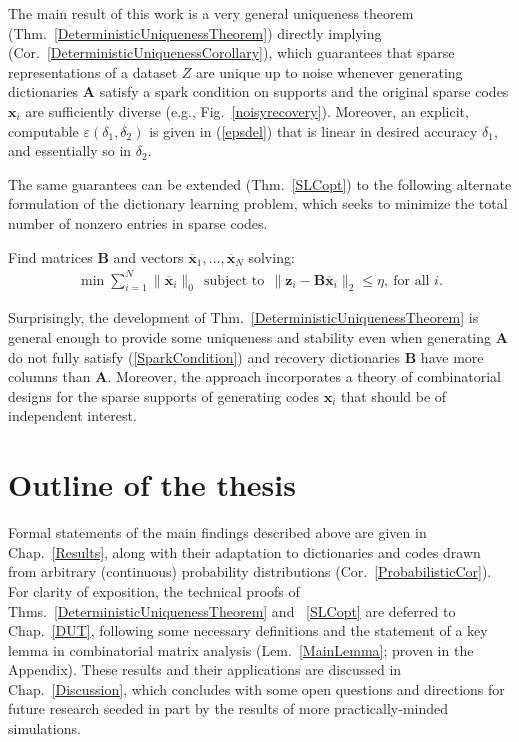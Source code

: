 The main result of this work is a very general uniqueness theorem (Thm.~\ref{DeterministicUniquenessTheorem}) directly 
implying (Cor.~\ref{DeterministicUniquenessCorollary}), which guarantees that sparse representations of a dataset $Z$ are unique up to noise whenever generating dictionaries $\mathbf{A}$ satisfy a spark condition on supports and the original sparse codes $\mathbf{x}_i$ are sufficiently diverse (e.g., Fig.~\ref{noisyrecovery}).  Moreover, an explicit, computable $\varepsilon(\delta_1, \delta_2)$ is given in (\ref{epsdel}) that is linear in desired accuracy $\delta_1$, and essentially so in $\delta_2$.

The same guarantees can be extended (Thm.~\ref{SLCopt}) to the following alternate formulation of the dictionary learning problem, which seeks to minimize the total number of nonzero entries in sparse codes.

\begin{problem}\label{OptimizationProblem}
Find matrices $\mathbf{B}$ and vectors \mbox{$\mathbf{\overline x}_1, \ldots, \mathbf{\overline x}_N$} solving:
\begin{align}\label{minsum}
\min \sum_{i = 1}^N \|\mathbf{\overline x}_{i}\|_0 \ \
\text{subject to} \ \ \|\mathbf{z}_i - \mathbf{B}\mathbf{\overline x}_i\|_2 \leq \eta, \ \text{for all $i$}.
\end{align}
\end{problem}

Surprisingly, the development of Thm.~\ref{DeterministicUniquenessTheorem} is general enough to provide some uniqueness and stability even when generating $\mathbf{A}$ do not fully satisfy (\ref{SparkCondition}) and recovery dictionaries $\mathbf{B}$ have more columns than $\mathbf{A}$.  Moreover, the approach incorporates a theory of combinatorial designs for the sparse supports of generating codes $\mathbf{x}_i$ that should be of independent interest. 

\section{Outline of the thesis}

Formal statements of the main findings described above are given in Chap.~\ref{Results}, along with their adaptation to dictionaries and codes drawn from arbitrary (continuous) probability distributions (Cor.~\ref{ProbabilisticCor}). For clarity of exposition, the technical proofs of Thms.~\ref{DeterministicUniquenessTheorem} and ~\ref{SLCopt} are deferred to Chap.~\ref{DUT}, following some necessary definitions and the statement of a key lemma in combinatorial matrix analysis (Lem.~\ref{MainLemma}; proven in the Appendix). These results and their applications are discussed in Chap.~\ref{Discussion}, which concludes with some open questions and directions for future research seeded in part by the results of more practically-minded simulations. 
